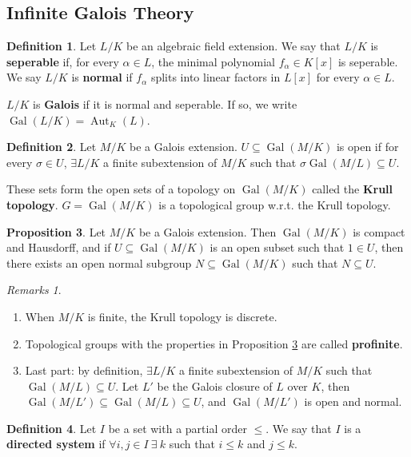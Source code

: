 \documentclass[a4paper]{article}
\theoremstyle{definition}
\newtheorem{definition}{Definition}
\theoremstyle{default}
\newtheorem{prop}[definition]{Proposition}
\theoremstyle{remark}
\newtheorem*{remarks}{Remarks}
\DeclareMathOperator{\Aut}{Aut}
\DeclareMathOperator{\Gal}{Gal}
\begin{document}
\subsection{Infinite Galois Theory}
\begin{definition}
	Let $L/K$ be an algebraic field extension.
	We say that $L/K$ is \textbf{seperable} if,
	for every $\alpha \in L$,
	the minimal polynomial $f_\alpha \in K[x]$ is seperable.	
	We say $L/K$ is \textbf{normal} if
	$f_\alpha$ splits into linear factors in $L[x]$ for every $\alpha \in L$.
	
	$L/K$ is \textbf{Galois} if it is normal and seperable.
	If so, we write $\Gal(L/K) = \Aut_K(L)$.
\end{definition}

\begin{definition}
	Let $M/K$ be a Galois extension.
	$U \subseteq \Gal(M/K)$ is open if for every $\sigma \in U$,
	$\exists L/K$ a finite subextension of $M/K$ such that $\sigma\Gal(M/L) \subseteq U$.
	
	These sets form the open sets of a topology on $\Gal(M/K)$ called the \textbf{Krull topology}.
	$G=\Gal(M/K)$ is a topological group w.r.t. the Krull topology.
\end{definition}

\begin{prop}
	Let $M/K$ be a Galois extension.
	Then $\Gal(M/K)$ is compact and Hausdorff,
	and if $U \subseteq \Gal(M/K)$ is an open subset such that $1 \in U$,
	then there exists an open normal subgroup $N \subseteq \Gal(M/K)$ such that $N \subseteq U$.
	\label{95}
\end{prop}

\begin{remarks}
	\begin{enumerate}
		\item When $M/K$ is finite, the Krull topology is discrete.
		\item Topological groups with the properties in Proposition \ref{95} are called \textbf{profinite}.
		\item Last part: by definition, $\exists L/K$ a finite subextension of $M/K$ such that $\Gal(M/L) \subseteq U$.
		Let $L'$ be the Galois closure of $L$ over $K$,
		then $\Gal(M/L') \subseteq \Gal(M/L) \subseteq U$,
		and $\Gal(M/L')$ is open and normal.
	\end{enumerate}
\end{remarks}

\begin{definition}
	Let $I$ be a set with a partial order $\leq$.
	We say that $I$ is a \textbf{directed system} if
	$\forall i,j \in I\ \exists\ k$ such that $i \leq k$ and $j \leq k$.
\end{definition}
\end{document}
